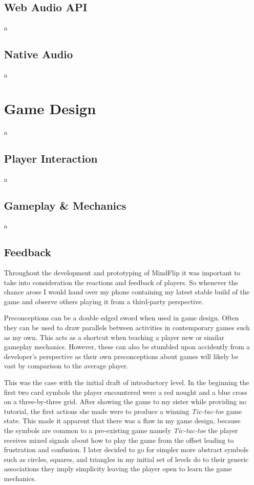 \documentclass[final]{cmpreport}
\begin{document}
\subsection{Web Audio API}
a

\subsection{Native Audio}
a

\section{Game Design}
a

\subsection{Player Interaction}
a

\subsection{Gameplay \& Mechanics}
a

\subsection{Feedback}
Throughout the development and prototyping of MindFlip it was important to take into consideration the reactions and feedback of players. So whenever the chance arose I would hand over my phone containing my latest stable build of the game and observe others playing it from a third-party perspective.

Preconceptions can be a double edged sword when used in game design. Often they can be used to draw parallels between activities in contemporary games such as my own. This acts as a shortcut when teaching a player new or similar gameplay mechanics. However, these can also be stumbled upon accidently from a developer's perspective as their own preconceptions about games will likely be vast by comparison to the average player.

This was the case with the initial draft of introductory level. In the beginning the first two card symbols the player encountered were a red nought and a blue cross on a three-by-three grid. After showing the game to my sister while providing no tutorial, the first actions she made were to produce a winning \emph{Tic-tac-toe} game state. This made it apparent that there was a flaw in my game design, because the symbols are common to a pre-existing game namely \emph{Tic-tac-toe} the player receives mixed signals about how to play the game from the offset leading to frustration and confusion. I later decided to go for simpler more abstract symbols such as circles, squares, and triangles in my initial set of levels do to their generic associations they imply simplicity leaving the player open to learn the game mechanics.
\end{document}
